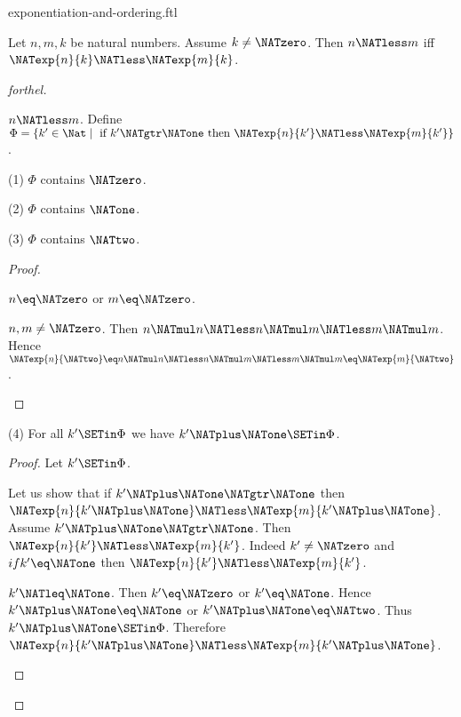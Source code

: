 \documentclass{naproche-library}
\begin{document}
\begin{smodule}[title=Exponentiation and Ordering]{exponentiation-and-ordering.ftl}

\begin{proposition}[forthel,id=ARITHMETIC_09_3373702288769024]
  Let $n, m, k$ be natural numbers.
  Assume $k \neq \NATzero$.
  Then $n \NATless m$ iff $\NATexp{n}{k} \NATless \NATexp{m}{k}$.
\end{proposition}
\begin{proof}[forthel]
  \begin{case}{$n \NATless m$.}
    Define $\Phi = \{ k' \in \Nat \mid\text{ if }k' \NATgtr \NATone\text{ then }\NATexp{n}{k'} \NATless \NATexp{m}{k'} \}$.

    (1) $\Phi$ contains $\NATzero$.

    (2) $\Phi$ contains $\NATone$.

    (3) $\Phi$ contains $\NATtwo$.
    \begin{proof}
      \begin{case}{$n \eq \NATzero$ or $m \eq \NATzero$.} \end{case}

      \begin{case}{$n, m \neq \NATzero$.}
        Then $n \NATmul n
          \NATless n \NATmul m
          \NATless m \NATmul m$.
        Hence $\NATexp{n}{\NATtwo}
          \eq n \NATmul n
          \NATless n \NATmul m
          \NATless m \NATmul m
          \eq \NATexp{m}{\NATtwo}$.
      \end{case}
    \end{proof}

    (4) For all $k' \SETin \Phi$ we have $k' \NATplus \NATone \SETin \Phi$.
    \begin{proof}
      Let $k' \SETin \Phi$.

      Let us show that if $k' \NATplus \NATone \NATgtr \NATone$ then $\NATexp{n}{k' \NATplus \NATone} \NATless \NATexp{m}{k' \NATplus \NATone}$.
        Assume $k' \NATplus \NATone \NATgtr \NATone$.
        Then $\NATexp{n}{k'} \NATless \NATexp{m}{k'}$.
        Indeed $k' \neq \NATzero$ and $if k' \eq \NATone$ then $\NATexp{n}{k'} \NATless \NATexp{m}{k'}$.

        \begin{case}{$k' \NATleq \NATone$.}
          Then $k' \eq \NATzero$ or $k' \eq \NATone$.
          Hence $k' \NATplus \NATone \eq \NATone$ or $k' \NATplus \NATone \eq \NATtwo$.
          Thus $k' \NATplus \NATone \SETin \Phi$.
          Therefore $\NATexp{n}{k' \NATplus \NATone} \NATless \NATexp{m}{k' \NATplus \NATone}$.
        \end{case}


\end{proof}
\end{case}
\end{proof}
\end{smodule}
\end{document}
